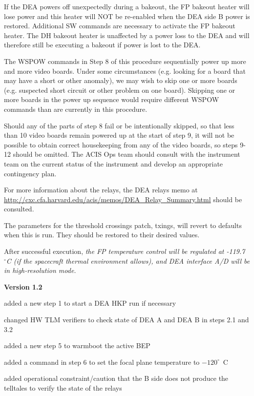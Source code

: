 \documentclass[11pt]{article}
\begin{document}
If the DEA powers off unexpectedly during a bakeout, the FP bakeout 
heater will lose power and this heater will NOT be re-enabled when the DEA side B 
power is restored. Additional SW commands are necessary to activate the FP bakeout 
heater. The DH bakeout heater is unaffected by a power loss to the DEA and will 
therefore still be executing a bakeout if power is lost to the DEA.

The WSPOW commands in Step 8 of this procedure sequentially power up more and more 
video boards. Under some circumstances (e.g. looking for a board that may have a 
short or other anomaly), we may wish to skip one or more boards (e.g. suspected 
short circuit or other problem on one board). Skipping one or more boards in the 
power up sequence would require different WSPOW commands than are currently in 
this procedure.

Should any of the parts of step 8 fail or be intentionally skipped, so that less 
than 10 video boards remain powered up at the start of step 9, it will not be 
possible to obtain correct housekeeping from any of the video boards, so steps 
9-12 should be omitted. The ACIS Ops team should consult with the instrument 
team on the current status of the instrument and develop an appropriate 
contingency plan.

For more information about the relays, the DEA relays memo at 
\url{http://cxc.cfa.harvard.edu/acis/memos/DEA_Relay_Summary.html} should be 
consulted.

The parameters for the threshold crossings patch, txings, will revert to defaults 
when this is run. They should be restored to their desired values.

After successful execution, {\em the FP temperature control will be regulated at 
-119.7~$^\circ$C (if the spacecraft thermal environment allows), and DEA interface 
A/D will be in high-resolution mode.}
\\

\newpage


\bd
\item {\bf Version 1.2}
\bi
\item added a new step 1 to start a DEA HKP run if necessary
\item changed HW TLM verifiers to check state of DEA A and DEA B in
steps 2.1 and 3.2
\item added a new step 5 to warmboot the active BEP
\item added a command in step 6 to set the focal plane temperature to
$-120^\circ$~C
\item added operational constraint/caution that the B side does not
produce the telltales to verify the state of the relays
\ei
\end{document}
